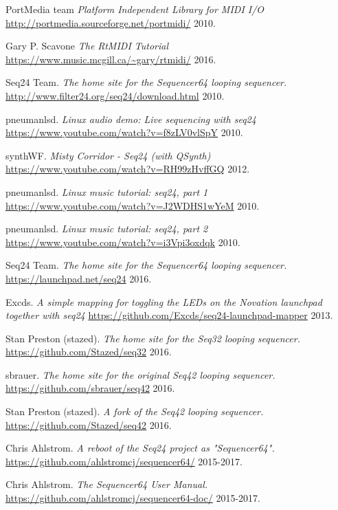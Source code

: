 \begin{thebibliography}{99}
   PortMedia team
   \emph{Platform Independent Library for MIDI I/O}
   \url{http://portmedia.sourceforge.net/portmidi/}
   2010.

   Gary P. Scavone
   \emph{The RtMIDI Tutorial}
   \url{https://www.music.mcgill.ca/~gary/rtmidi/}
   2016.

   Seq24 Team.
   \emph{The home site for the Sequencer64 looping sequencer.}
   \url{http://www.filter24.org/seq24/download.html}
   2010.

   pneumanlsd.
   \emph{Linux audio demo: Live sequencing with seq24}
   \url{https://www.youtube.com/watch?v=f8zLV0vlSpY}
   2010.

   synthWF.
   \emph{Misty Corridor - Seq24 (with QSynth)}
   \url{https://www.youtube.com/watch?v=RH99zHvffGQ}
   2012.

   pneumanlsd.
   \emph{Linux music tutorial: seq24, part 1}
   \url{https://www.youtube.com/watch?v=J2WDHS1wYeM}
   2010.
   
   pneumanlsd.
   \emph{Linux music tutorial: seq24, part 2}
   \url{https://www.youtube.com/watch?v=i3Vpi3oxdqk}
   2010.

   Seq24 Team.
   \emph{The home site for the Sequencer64 looping sequencer.}
   \url{https://launchpad.net/seq24}
   2016.

   Excds.
   \emph{A simple mapping for toggling the LEDs on the Novation launchpad
   together with seq24}
   \url{https://github.com/Excds/seq24-launchpad-mapper}
   2013.

   Stan Preston (stazed).
   \emph{The home site for the Seq32 looping sequencer.}
   \url{https://github.com/Stazed/seq32}
   2016.

   sbrauer.
   \emph{The home site for the original Seq42 looping sequencer.}
   \url{https://github.com/sbrauer/seq42}
   2016.

   Stan Preston (stazed).
   \emph{A fork of the Seq42 looping sequencer.}
   \url{https://github.com/Stazed/seq42}
   2016.

   Chris Ahlstrom.
   \emph{A reboot of the Seq24 project as "Sequencer64".}
   \url{https://github.com/ahlstromcj/sequencer64/}
   2015-2017.

   Chris Ahlstrom.
   \emph{The Sequencer64 User Manual.}
   \url{https://github.com/ahlstromcj/sequencer64-doc/}
   2015-2017.


\end{thebibliography}
